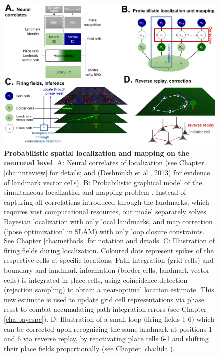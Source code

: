\begin{figure}[h]
	\centering
	\includegraphics[width=\textwidth]{img/neurimpl3}
	\caption[Probabilistic spatial localization and mapping on the neuronal level]{\textbf{Probabilistic spatial localization and mapping on the neuronal level}. A: Neural correlates of localization (see Chapter \ref{cha:nnreview} for details; and (Deshmukh et al., 2013) for evidence of landmark vector cells). B: Probabilistic graphical model of the simultaneous localization and mapping problem \citep{thrun2008simultaneous}. Instead of capturing all correlations introduced through the landmarks, which requires vast computational resources, our model separately solves Bayesian localization with only local landmarks, and map correction (`pose optimization' in SLAM) with only loop closure constraints. See Chapter \ref{cha:methods} for notation and details. C: Illustration of firing fields during localization. Coloured dots represent spikes of the respective cells at specific locations. Path integration (grid cells) and boundary and landmark information (border cells, landmark vector cells) is integrated in place cells, using coincidence detection (rejection sampling) to obtain a near-optimal location estimate. This new estimate is used to update grid cell representations via phase reset to combat accumulating path integration errors (see Chapter \ref{cha:bayespc}). D: Illustration of a small loop (firing fields 1-6) which can be corrected upon recognizing the same landmark at positions 1 and 6 via reverse replay, by reactivating place cells 6-1 and shifting their place fields proportionally (see Chapter \ref{cha:lida}).} 
	\label{fig:neurimpl}
\end{figure}

